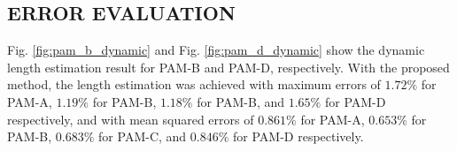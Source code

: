 \vspace{1cm}

\subsection{ERROR EVALUATION} 
Fig. \ref{fig:pam_b_dynamic} and Fig. \ref{fig:pam_d_dynamic} show the dynamic length estimation result for PAM-B and PAM-D, respectively.
With the proposed method, the length estimation was achieved with maximum errors of $1.72\%$ for PAM-A, $1.19\%$ for PAM-B, $1.18\%$ for PAM-B, and  $1.65\%$ for PAM-D respectively, and with mean squared errors of $0.861\%$ for PAM-A, $0.653\%$ for PAM-B, $0.683\%$ for PAM-C, and $0.846\%$ for PAM-D respectively.








